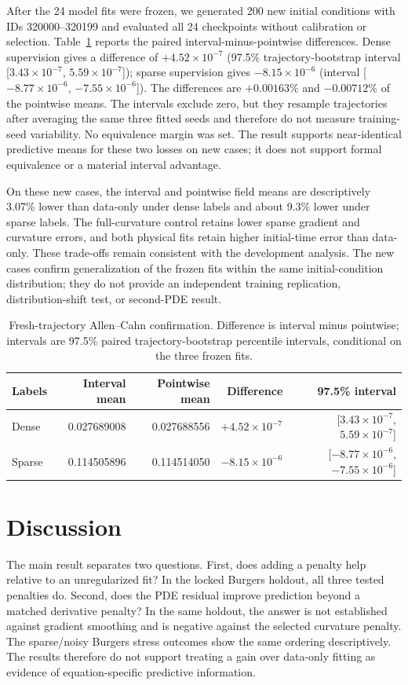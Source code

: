 \documentclass[a4paper,fleqn]{cas-sc}
\begin{document}
After the 24 model fits were frozen, we generated 200 new initial conditions with IDs 320000--320199 and evaluated all 24 checkpoints without calibration or selection. Table~\ref{tab:allen-fresh} reports the paired interval-minus-pointwise differences. Dense supervision gives a difference of $+4.52\times10^{-7}$ (97.5\% trajectory-bootstrap interval [$3.43\times10^{-7}$, $5.59\times10^{-7}$]); sparse supervision gives $-8.15\times10^{-6}$ (interval [$-8.77\times10^{-6}$, $-7.55\times10^{-6}$]). The differences are $+0.00163\%$ and $-0.00712\%$ of the pointwise means. The intervals exclude zero, but they resample trajectories after averaging the same three fitted seeds and therefore do not measure training-seed variability. No equivalence margin was set. The result supports near-identical predictive means for these two losses on new cases; it does not support formal equivalence or a material interval advantage.

On these new cases, the interval and pointwise field means are descriptively 3.07\% lower than data-only under dense labels and about 9.3\% lower under sparse labels. The full-curvature control retains lower sparse gradient and curvature errors, and both physical fits retain higher initial-time error than data-only. These trade-offs remain consistent with the development analysis. The new cases confirm generalization of the frozen fits within the same initial-condition distribution; they do not provide an independent training replication, distribution-shift test, or second-PDE result.

\begin{table}
\centering\scriptsize
\caption{Fresh-trajectory Allen--Cahn confirmation. Difference is interval minus pointwise; intervals are 97.5\% paired trajectory-bootstrap percentile intervals, conditional on the three frozen fits.}
\label{tab:allen-fresh}
\begin{tabular}{lrrrr}
\toprule
Labels & Interval mean & Pointwise mean & Difference & 97.5\% interval \\
\midrule
Dense & 0.027689008 & 0.027688556 & $+4.52\times10^{-7}$ & [$3.43\times10^{-7}$, $5.59\times10^{-7}$] \\
Sparse & 0.114505896 & 0.114514050 & $-8.15\times10^{-6}$ & [$-8.77\times10^{-6}$, $-7.55\times10^{-6}$] \\
\bottomrule
\end{tabular}
\end{table}

\section{Discussion}
The main result separates two questions. First, does adding a penalty help relative to an unregularized fit? In the locked Burgers holdout, all three tested penalties do. Second, does the PDE residual improve prediction beyond a matched derivative penalty? In the same holdout, the answer is not established against gradient smoothing and is negative against the selected curvature penalty. The sparse/noisy Burgers stress outcomes show the same ordering descriptively. The results therefore do not support treating a gain over data-only fitting as evidence of equation-specific predictive information.
\end{document}
